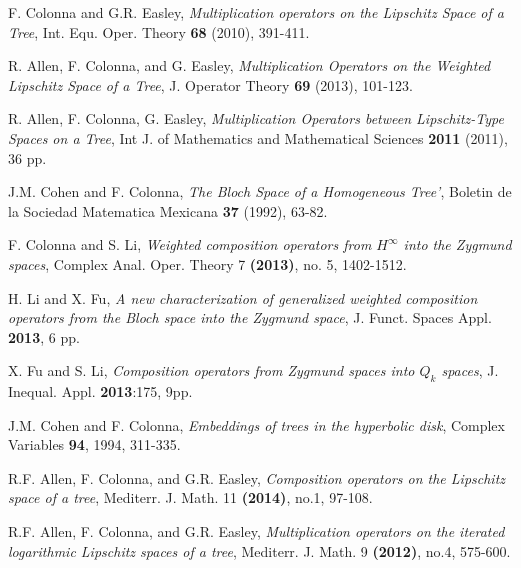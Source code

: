 \documentclass[11 pt]{report}
\theoremstyle{definition}
\theoremstyle{definition}
\begin{document}
\begin{thebibliography}{1000}
F. Colonna and G.R. Easley, \textit{Multiplication operators on the Lipschitz Space of a Tree}, Int. Equ. Oper. Theory \textbf{68} (2010), 391-411.

R. Allen, F. Colonna, and G. Easley, \textit{Multiplication Operators on the Weighted Lipschitz Space of a Tree}, J. Operator Theory \textbf{69} (2013), 101-123.

R. Allen, F. Colonna, G. Easley, \textit{Multiplication Operators between Lipschitz-Type Spaces on a Tree}, Int J. of Mathematics and Mathematical Sciences \textbf{2011} (2011), 36 pp.

J.M. Cohen and F. Colonna, \textit{The Bloch Space of a Homogeneous Tree'}, Boletin de la Sociedad Matematica Mexicana \textbf{37} (1992), 63-82.

F. Colonna and S. Li, \textit{Weighted composition operators from $H^\infty$ into the Zygmund spaces}, Complex Anal. Oper. Theory 7 \textbf{(2013)}, no. 5, 1402-1512. 

H. Li and X. Fu, \textit{A new characterization of generalized weighted composition operators from the Bloch space into the Zygmund space}, J. Funct. Spaces Appl. \textbf{2013}, 6 pp.

X. Fu and S. Li, \textit{Composition operators from Zygmund spaces into $Q_k$ spaces}, J. Inequal. Appl. \textbf{2013}:175, 9pp. 

J.M. Cohen and F. Colonna, \textit{Embeddings of trees in the hyperbolic disk}, Complex Variables \textbf{94}, 1994, 311-335.

R.F. Allen, F. Colonna, and G.R. Easley, \textit{Composition operators on the Lipschitz space of a tree}, Mediterr. J. Math. 11 \textbf{(2014)}, no.1, 97-108.

R.F. Allen, F. Colonna, and G.R. Easley, \textit{Multiplication operators on the iterated logarithmic Lipschitz spaces of a tree}, Mediterr. J. Math. 9 \textbf{(2012)}, no.4, 575-600.
\end{thebibliography}


\end{document}
